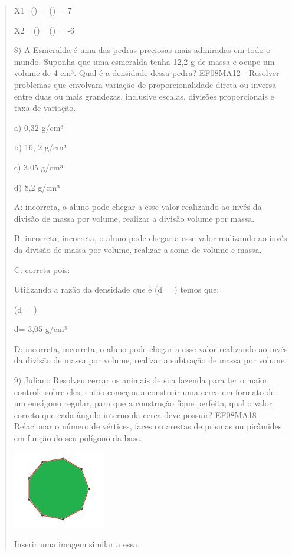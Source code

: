 \begin{quote}
\begin{escolha}
X1=() = () = 7

X2= ()= () = -6

8) A Esmeralda é uma das pedras preciosas mais admiradas em todo o
mundo. Suponha que uma esmeralda tenha 12,2 g de massa e ocupe um volume
de 4 cm³. Qual é a densidade dessa pedra? EF08MA12 - Resolver problemas
que envolvam variação de proporcionalidade direta ou inversa entre duas
ou mais grandezas, inclusive escalas, divisões proporcionais e taxa de
variação.

a) 0,32 g/cm³

b) 16, 2 g/cm³

c) 3,05 g/cm³

d) 8,2 g/cm³

A: incorreta, o aluno pode chegar a esse valor realizando ao invés da
divisão de massa por volume, realizar a divisão volume por massa.

B: incorreta, incorreta, o aluno pode chegar a esse valor realizando ao
invés da divisão de massa por volume, realizar a soma de volume e massa.

C: correta pois:

Utilizando a razão da densidade que é (d = ) temos que:

(d = )

d= 3,05 g/cm³

D: incorreta, incorreta, o aluno pode chegar a esse valor realizando ao
invés da divisão de massa por volume, realizar a subtração de massa por
volume.

9) Juliano Resolveu cercar os animais de sua fazenda para ter o maior
controle sobre eles, então começou a construir uma cerca em formato de
um eneágono regular, para que a construção fique perfeita, qual o valor
correto que cada ângulo interno da cerca deve possuir? EF08MA18-
Relacionar o número de vértices, faces ou arestas de prismas ou
pirâmides, em função do seu polígono da base.

\includegraphics[width=1.575in,height=1.33385in]{./imgSAEB_8_MAT/media/image60.png}

Inserir uma imagem similar a essa.


\end{escolha}
\end{quote}

